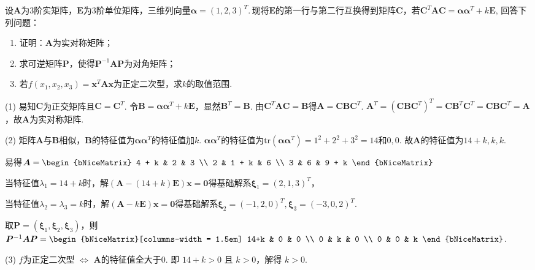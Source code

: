 \documentclass[12pt, a4paper, oneside, UTF8]{ctexbook}
\begin{document}
\begin{exercise}
    设$\bm{A}$为$3$阶实矩阵，$\bm{E}$为$3$阶单位矩阵，三维列向量$\bm{\alpha}=(1,2,3)^T$.\,现将$\bm{E}$的第一行与第二行互换得到矩阵$\bm{C}$，若$\bm{C}^T\bm{AC}=\bm{\alpha\alpha}^T+k\bm{E},\,$回答下列问题：
    \begin{enumerate}[label = (\arabic*)]
        \item 证明：$\bm{A}$为实对称矩阵；
        \item 求可逆矩阵$\bm{P}$，使得$\bm{P}^{-1}\bm{AP}$为对角矩阵；
        \item 若$f(x_1,x_2,x_3)=\bm{x}^T\bm{Ax}$为正定二次型，求$k$的取值范围.
    \end{enumerate}
\end{exercise}
\begin{solution}
    (1) 易知$\bm{C}$为正交矩阵且$\bm{C}=\bm{C}^T$. 令$\bm{B}=\bm{\alpha\alpha}^T+k\bm{E}$，显然$\bm{B}^T=\bm{B}$.
    由$\bm{C}^T\bm{AC}=\bm{B}$得$\bm{A}=\bm{C}\bm{B}\bm{C}^T$.
    $\bm{A}^T = (\bm{C}\bm{B}\bm{C}^T)^T = \bm{C}\bm{B}^T\bm{C}^T = \bm{C}\bm{B}\bm{C}^T = \bm{A}$，故$\bm{A}$为实对称矩阵.

    (2) 矩阵$\bm{A}$与$\bm{B}$相似，$\bm{B}$的特征值为$\bm{\alpha\alpha}^T$的特征值加$k$.
    $\bm{\alpha\alpha}^T$的特征值为$\text{tr}(\bm{\alpha\alpha}^T)=1^2+2^2+3^2=14$和$0,0$.
    故$\bm{A}$的特征值为$14+k, k, k$.
    
    易得$\bm{A}=\begin{bNiceMatrix}
        4 + k & 2 & 3 \\
        2 & 1 + k & 6 \\
        3 & 6 & 9 + k
    \end{bNiceMatrix}$

    当特征值$\lambda_1=14+k$时，解$(\bm{A}-(14+k)\bm{E})\bm{x}=\bm{0}$得基础解系$\bm{\xi}_1=(2,1,3)^T$，

    当特征值$\lambda_2=\lambda_3=k$时，解$(\bm{A}-k\bm{E})\bm{x}=\bm{0}$得基础解系$\bm{\xi}_2=(-1,2,0)^T, \bm{\xi}_3=(-3,0,2)^T$.

    取$\bm{P}=(\bm{\xi}_1, \bm{\xi}_2, \bm{\xi}_3)$，则$\bm{P}^{-1}\bm{AP} = \begin{bNiceMatrix}[columns-width = 1.5em]
        14+k & 0 & 0 \\
        0 & k & 0 \\
        0 & 0 & k
    \end{bNiceMatrix}$.


    (3) $f$为正定二次型 $\iff$ $\bm{A}$的特征值全大于0.
    即 $14+k>0$ 且 $k>0$，解得 $\boxed{k>0}$.
\end{solution}
\ifx\allfiles\undefined
\end{document}
